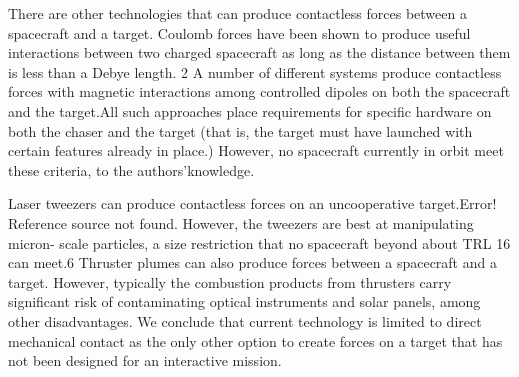There are other technologies that can produce
contactless forces between a spacecraft and a target.
Coulomb forces have been shown to produce useful
interactions between two charged spacecraft as long as
the distance between them is less than a Debye length. ‎2
A number of different systems produce contactless
forces with magnetic interactions among controlled
dipoles on both the spacecraft and the target.All such approaches place requirements for specific hardware on both the chaser and the target (that is, the target must have launched with certain features already in place.) However, no spacecraft currently in orbit meet these criteria, to the
authors’‎knowledge.

Laser tweezers can produce contactless forces on an
uncooperative target.Error! Reference source not found.
However, the tweezers are best at manipulating micron- scale particles, a size restriction that no spacecraft beyond about TRL 1‎6 can meet.6‎ Thruster plumes can also produce forces between a spacecraft and a target. However, typically the combustion products from thrusters carry significant risk of contaminating optical instruments and solar panels, among other disadvantages. We conclude that current technology is limited to direct mechanical contact as the only other option to create forces on a target that has not been designed for an interactive mission.